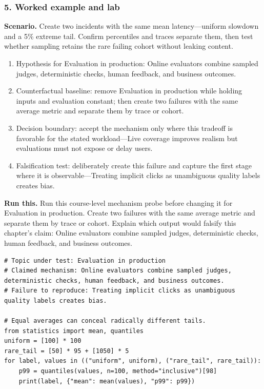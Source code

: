 \subsubsection*{5. Worked example and lab}
\textbf{Scenario.} Create two incidents with the same mean latency—uniform slowdown and a 5\% extreme tail. Confirm percentiles and traces separate them, then test whether sampling retains the rare failing cohort without leaking content.
\begin{enumerate}
\item Hypothesis for Evaluation in production: Online evaluators combine sampled judges, deterministic checks, human feedback, and business outcomes.
\item Counterfactual baseline: remove Evaluation in production while holding inputs and evaluation constant; then create two failures with the same average metric and separate them by trace or cohort.
\item Decision boundary: accept the mechanism only where this tradeoff is favorable for the stated workload—Live coverage improves realism but evaluations must not expose or delay users.
\item Falsification test: deliberately create this failure and capture the first stage where it is observable—Treating implicit clicks as unambiguous quality labels creates bias.
\end{enumerate}
\textbf{Run this.} Run this course-level mechanism probe before changing it for Evaluation in production. Create two failures with the same average metric and separate them by trace or cohort. Explain which output would falsify this chapter's claim: Online evaluators combine sampled judges, deterministic checks, human feedback, and business outcomes.
\begin{Verbatim}[fontsize=\scriptsize]
# Topic under test: Evaluation in production
# Claimed mechanism: Online evaluators combine sampled judges, deterministic checks, human feedback, and business outcomes.
# Failure to reproduce: Treating implicit clicks as unambiguous quality labels creates bias.

# Equal averages can conceal radically different tails.
from statistics import mean, quantiles
uniform = [100] * 100
rare_tail = [50] * 95 + [1050] * 5
for label, values in (("uniform", uniform), ("rare_tail", rare_tail)):
    p99 = quantiles(values, n=100, method="inclusive")[98]
    print(label, {"mean": mean(values), "p99": p99})
\end{Verbatim}
